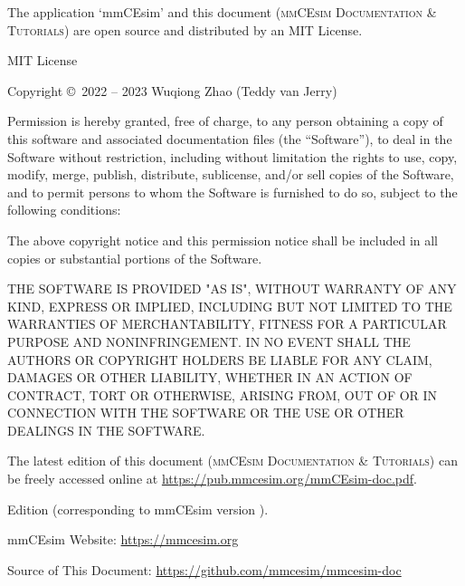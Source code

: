 \noindent
The application `mmCEsim' and this document
(\textsc{mmCEsim Documentation \& Tutorials})
are open source and distributed by an MIT License.
\newline

\noindent
MIT License
\newline

\noindent
Copyright \copyright~2022 -- 2023 Wuqiong Zhao (Teddy van Jerry)
\newline

\noindent
Permission is hereby granted, free of charge, to any person obtaining a copy
of this software and associated documentation files (the ``Software''), to deal
in the Software without restriction, including without limitation the rights
to use, copy, modify, merge, publish, distribute, sublicense, and/or sell
copies of the Software, and to permit persons to whom the Software is
furnished to do so, subject to the following conditions:
\newline

\noindent
The above copyright notice and this permission notice shall be included in all
copies or substantial portions of the Software.
\newline

\noindent
THE SOFTWARE IS PROVIDED "AS IS", WITHOUT WARRANTY OF ANY KIND, EXPRESS OR
IMPLIED, INCLUDING BUT NOT LIMITED TO THE WARRANTIES OF MERCHANTABILITY,
FITNESS FOR A PARTICULAR PURPOSE AND NONINFRINGEMENT. IN NO EVENT SHALL THE
AUTHORS OR COPYRIGHT HOLDERS BE LIABLE FOR ANY CLAIM, DAMAGES OR OTHER
LIABILITY, WHETHER IN AN ACTION OF CONTRACT, TORT OR OTHERWISE, ARISING FROM,
OUT OF OR IN CONNECTION WITH THE SOFTWARE OR THE USE OR OTHER DEALINGS IN THE
SOFTWARE.
\newline
\newline

\noindent
The latest edition of this document (\textsc{mmCEsim Documentation \& Tutorials})
can be freely accessed online at \url{https://pub.mmcesim.org/mmCEsim-doc.pdf}.
\newline

\noindent
Edition \mmCEsimDate{}
(corresponding to mmCEsim version \mmCEsimVersion).

\vfill
\noindent
mmCEsim Website: \url{https://mmcesim.org}

\noindent
Source of This Document: \url{https://github.com/mmcesim/mmcesim-doc}
